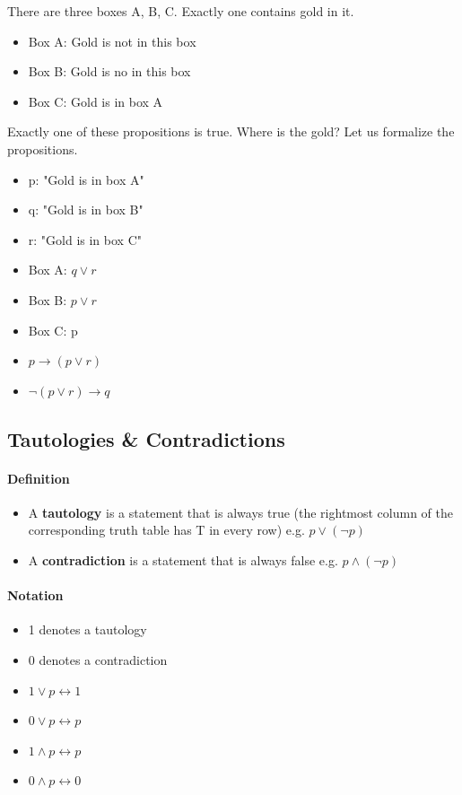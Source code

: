 \documentclass[9pt, letterpaper, oneside]{article}
\begin{document}
There are three boxes A, B, C. Exactly one contains gold in it.
\begin{itemize}
	\item Box A: Gold is not in this box
	\item Box B: Gold is no in this box
	\item Box C: Gold is in box A
\end{itemize}
Exactly one of these propositions is true. Where is the gold?
Let us formalize the propositions.
\begin{itemize}
	\item p:  "Gold is in box A"
	\item q:  "Gold is in box B"
	\item r:  "Gold is in box C"
	\item Box A: $q \vee r$
	\item Box B: $p \vee r$
	\item Box C: p
	\item $p \to (p \vee r)$
	\item $\neg (p \vee r) \to q$
\end{itemize}


\subsection{Tautologies \& Contradictions}

\paragraph{Definition}
\begin{itemize}
	\item A \textbf{tautology} is a statement that is always true (the rightmost column of the corresponding truth table has T in every row) e.g. $p \vee (\neg p)$
	\item A \textbf{contradiction} is a statement that is always false e.g. $p \wedge (\neg p)$
\end{itemize}

\paragraph{Notation}
\begin{itemize}
	\item 1 denotes a tautology
	\item 0 denotes a contradiction
	\item $1 \vee p \leftrightarrow 1$
	\item $0 \vee p \leftrightarrow p$
	\item $1 \wedge p \leftrightarrow p$
	\item $0 \wedge p \leftrightarrow 0$
\end{itemize}
\end{document}
